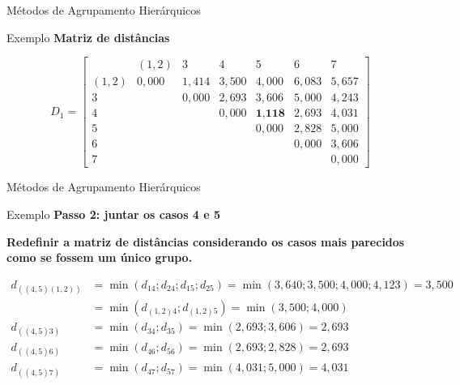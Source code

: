 \documentclass[
  ignorenonframetext,
  aspectratio=169,
]{beamer}
\begin{document}
\begin{frame}{Métodos de Agrupamento Hierárquicos}
\protect{}\label{muxe9todos-de-agrupamento-hieruxe1rquicos-18}
\begin{block}{Exemplo}
\protect{}\label{exemplo-7}
\textbf{Matriz de distâncias}

\[D_1 = \left[ \begin{matrix}
&(1,2)&3&4&5&6&7\\ 
(1,2)& 0,000 & 1,414 & 3,500 & 4,000 & 6,083 & 5,657 \\
3  &  & 0,000 & 2,693 & 3,606 & 5,000 & 4,243 \\
4  &  &  & 0,000 & \textbf{1,118} & 2,693 & 4,031 \\
5 &  &  &  & 0,000 & 2,828 & 5,000 \\
6  &  &  &  &  & 0,000 & 3,606 \\
7  &  &  &  &  &  & 0,000
                    \end{matrix} \right]\]
\end{block}
\end{frame}

\begin{frame}{Métodos de Agrupamento Hierárquicos}
\protect{}\label{muxe9todos-de-agrupamento-hieruxe1rquicos-19}
\begin{block}{Exemplo}
\protect{}\label{exemplo-8}
\textbf{Passo 2: juntar os casos 4 e 5}

\textbf{Redefinir a matriz de distâncias considerando os casos mais
parecidos como se fossem um único grupo.}

\[
\begin{aligned}
d_{((4,5)(1,2))} &=  \min(d_{14};d_{24};d_{15};d_{25}) = \min(3,640; 3,500; 4,000; 4,123) = 3,500 \\ &= 
\min(d_{(1,2)4};d_{(1,2)5}) = \min(3,500;4,000) \\
d_{((4,5)3)} &=  \min(d_{34};d_{35}) = \min(2,693; 3,606) = 2,693 \\
d_{((4,5)6)} &=  \min(d_{46};d_{56}) = \min(2,693; 2,828) = 2,693 \\
d_{((4,5)7)} &=  \min(d_{47};d_{57}) = \min(4,031; 5,000) = 4,031 
\end{aligned}
\]
\end{block}
\end{frame}
\end{document}

